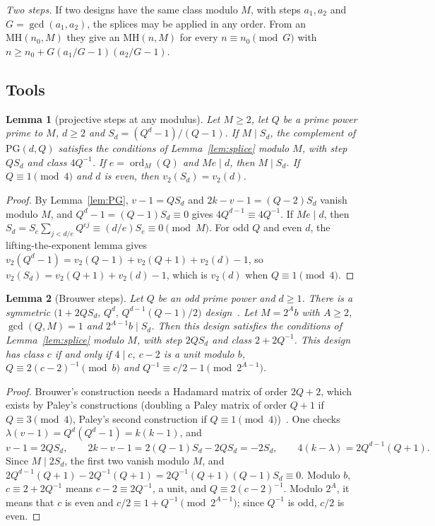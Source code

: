 \documentclass[10pt]{article}
\newtheorem{lemma}{Lemma}
\theoremstyle{remark}
\newcommand{\MH}{\mathrm{MH}}
\newcommand{\ord}{\operatorname{ord}}
\newcommand{\PG}{\mathrm{PG}}
\begin{document}
\emph{Two steps.} If two designs have the same class modulo $M$, with steps $a_1,a_2$ and $G=\gcd(a_1,a_2)$, the splices may be applied in any order. From an $\MH(n_0,M)$ they give an $\MH(n,M)$ for every $n\equiv n_0\pmod G$ with $n\ge n_0+G(a_1/G-1)(a_2/G-1)$.

\subsection{Tools}
\begin{lemma}[projective steps at any modulus]\label{lem:PGM}
Let $M\ge2$, let $Q$ be a prime power prime to $M$, $d\ge2$ and $S_d=(Q^d-1)/(Q-1)$. If $M\mid S_d$, the complement of $\PG(d,Q)$ satisfies the conditions of Lemma~\ref{lem:splice} modulo $M$, with step $QS_d$ and class $4Q^{-1}$. If $e=\ord_M(Q)$ and $Me\mid d$, then $M\mid S_d$. If $Q\equiv1\pmod4$ and $d$ is even, then $v_2(S_d)=v_2(d)$.
\end{lemma}

\begin{proof}
By Lemma~\ref{lem:PG}, $v-1=QS_d$ and $2k-v-1=(Q-2)S_d$ vanish modulo $M$, and $Q^d-1=(Q-1)S_d\equiv0$ gives $4Q^{d-1}\equiv4Q^{-1}$. If $Me\mid d$, then $S_d=S_e\sum_{j<d/e}Q^{ej}\equiv(d/e)S_e\equiv0\pmod M$. For odd $Q$ and even $d$, the lifting-the-exponent lemma gives $v_2(Q^d-1)=v_2(Q-1)+v_2(Q+1)+v_2(d)-1$, so $v_2(S_d)=v_2(Q+1)+v_2(d)-1$, which is $v_2(d)$ when $Q\equiv1\pmod 4$.
\end{proof}

\begin{lemma}[Brouwer steps]\label{lem:brouwer}
Let $Q$ be an odd prime power and $d\ge1$. There is a symmetric $\bigl(1+2QS_d,\,Q^d,\,Q^{d-1}(Q-1)/2\bigr)$ design~\cite{Br83}. Let $M=2^Ab$ with $A\ge2$, $\gcd(Q,M)=1$ and $2^{A-1}b\mid S_d$. Then this design satisfies the conditions of Lemma~\ref{lem:splice} modulo $M$, with step $2QS_d$ and class $2+2Q^{-1}$. This design has class $c$ if and only if $4\mid c$, $c-2$ is a unit modulo $b$, $Q\equiv2(c-2)^{-1}\pmod b$ and $Q^{-1}\equiv c/2-1\pmod{2^{A-1}}$.
\end{lemma}

\begin{proof}
Brouwer's construction needs a Hadamard matrix of order $2Q+2$, which exists by Paley's constructions (doubling a Paley matrix of order $Q+1$ if $Q\equiv3\pmod4$, Paley's second construction if $Q\equiv1\pmod4$)~\cite{Br83,Pa33}. One checks $\lambda(v-1)=Q^d(Q^d-1)=k(k-1)$, and
\[
v-1=2QS_d,\qquad 2k-v-1=2(Q-1)S_d-2QS_d=-2S_d,\qquad 4(k-\lambda)=2Q^{d-1}(Q+1).
\]
Since $M\mid2S_d$, the first two vanish modulo $M$, and $2Q^{d-1}(Q+1)-2Q^{-1}(Q+1)=2Q^{-1}(Q+1)(Q-1)S_d\equiv0$. Modulo $b$, $c\equiv2+2Q^{-1}$ means $c-2\equiv2Q^{-1}$, a unit, and $Q\equiv2(c-2)^{-1}$. Modulo $2^A$, it means that $c$ is even and $c/2\equiv1+Q^{-1}\pmod{2^{A-1}}$; since $Q^{-1}$ is odd, $c/2$ is even.
\end{proof}
\end{document}
